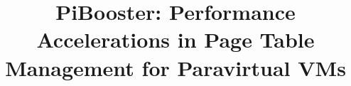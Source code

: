 \documentclass[10pt,preprint]{sigplanconf}
\begin{document}
\newcommand{\name}{PiBooster\xspace}
\newcommand{\cache}{PiBooster cache\xspace}
\newcommand{\module}{PiBooster module\xspace}
\newcommand{\prename}{Pre-PiBooster\xspace}
\newcommand{\dynname}{Dyn-PiBooster\xspace}
\newcommand{\eat}[1]{}  %
\newcommand{\authcomment}[3]{\textcolor{#3}{#1 says: #2}}\newcommand{\yueqiang}[1]{\authcomment{Yueqiang}{#1}{red}}
\newcommand{\zhi}[1]{\authcomment{Zhi}{#1}{blue}}
\newcommand{\mypara}[1]{\vspace{2pt}\noindent\textbf{{#1. }}}


\date{}

\title{\Large \bf PiBooster: Performance Accelerations in Page Table Management for Paravirtual VMs}


\maketitle
\end{document}
